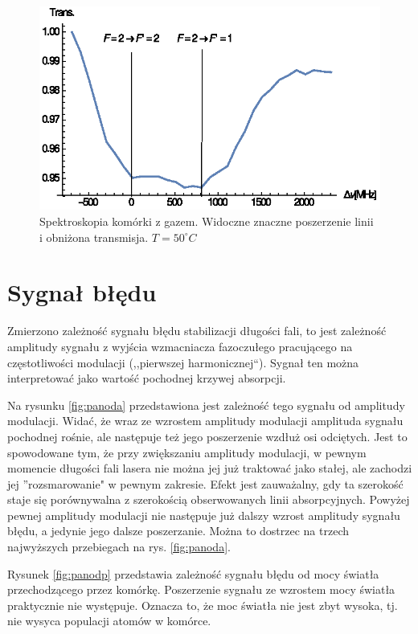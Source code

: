 \documentclass[a4paper,10pt]{article}
\begin{document}
\begin{figure}[h!]
\centering
 \includegraphics[width=\textwidth]{spek_gaz.eps}
 \caption{Spektroskopia komórki z gazem. Widoczne znaczne poszerzenie linii i obniżona transmisja. $T=50^{\circ}C$}
 \label{fig:spekgaz}
\end{figure}


\section{Sygnał błędu}

Zmierzono zależność sygnału błędu stabilizacji długości fali, to jest zależność amplitudy sygnału z wyjścia wzmacniacza fazoczułego pracującego na częstotliwości modulacji (,,pierwszej harmonicznej``). Sygnał ten można interpretować jako wartość pochodnej krzywej absorpcji.

Na rysunku \ref{fig:panoda} przedstawiona jest zależność tego sygnału od amplitudy modulacji. Widać, że wraz ze wzrostem amplitudy modulacji amplituda sygnału pochodnej rośnie, ale następuje też jego poszerzenie wzdłuż osi odciętych. Jest to spowodowane tym, że przy zwiększaniu amplitudy modulacji, w pewnym momencie długości fali lasera nie można jej już traktować jako stałej, ale zachodzi jej ''rozsmarowanie" w pewnym zakresie. Efekt jest zauważalny, gdy ta szerokość staje się porównywalna z szerokością obserwowanych linii absorpcyjnych. Powyżej pewnej amplitudy modulacji nie następuje już dalszy wzrost amplitudy sygnału błędu, a jedynie jego dalsze poszerzanie. Można to dostrzec na trzech najwyższych przebiegach na rys. \ref{fig:panoda}.

Rysunek \ref{fig:panodp} przedstawia zależność sygnału błędu od mocy światła przechodzącego przez komórkę. Poszerzenie sygnału ze wzrostem mocy światła praktycznie nie występuje. Oznacza to, że moc światła nie jest zbyt wysoka, tj. nie wysyca populacji atomów w komórce.
\end{document}

